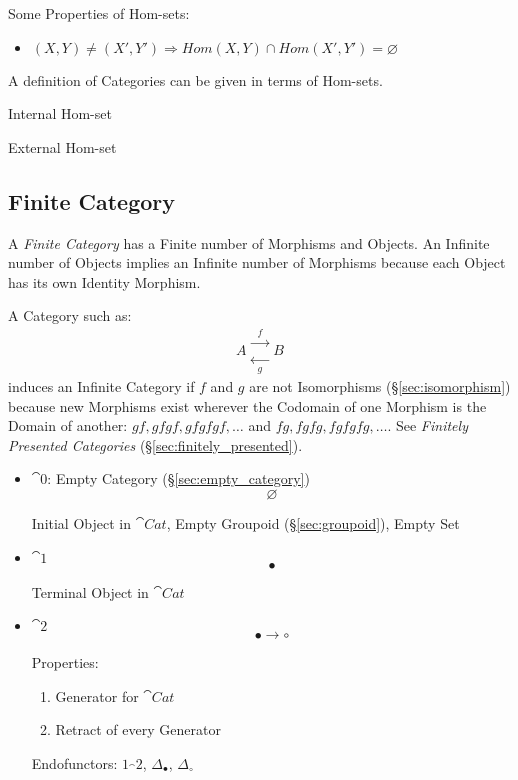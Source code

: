 Some Properties of Hom-sets:
\begin{itemize}
\item $ (X,Y) \neq (X',Y') \Rightarrow
  Hom(X,Y) \cap Hom(X',Y') = \varnothing$
\end{itemize}

A definition of Categories can be given in terms of Hom-sets. %

Internal Hom-set

External Hom-set



\subsection{Finite Category}\label{sec:finite_category}

A \emph{Finite Category} has a Finite number of Morphisms and Objects.
An Infinite number of Objects implies an Infinite number of Morphisms
because each Object has its own Identity Morphism.

A Category such as:
\[
  A
  \begin{matrix}
  \xrightarrow{\;\;f\;\;}\\
  \xleftarrow[\;\;g\;\;]{}
  \end{matrix}
  B
\]
induces an Infinite Category if $f$ and $g$ are not Isomorphisms
(\S\ref{sec:isomorphism}) because new Morphisms exist wherever the
Codomain of one Morphism is the Domain of another: $gf, gfgf, gfgfgf,
\ldots$ and $fg, fgfg, fgfgfg, \ldots$. See \emph{Finitely Presented
  Categories} (\S\ref{sec:finitely_presented}).

\begin{itemize}
  \item $\cat{0}$: Empty Category (\S\ref{sec:empty_category})
    \[
      \varnothing
    \]

    Initial Object in $\cat{Cat}$, Empty Groupoid
    (\S\ref{sec:groupoid}), Empty Set

  \item $\cat{1}$
    \[
      \bullet
    \]

    Terminal Object in $\cat{Cat}$

  \item $\cat{2}$
    \[
      \bullet \longrightarrow \circ
    \]

    Properties:
    \begin{enumerate}
    \item Generator for $\cat{Cat}$ %
    \item Retract of every Generator
    \end{enumerate}

    Endofunctors: $1_\cat{2}$, $\Delta_\bullet$, $\Delta_\circ$

\end{itemize}

